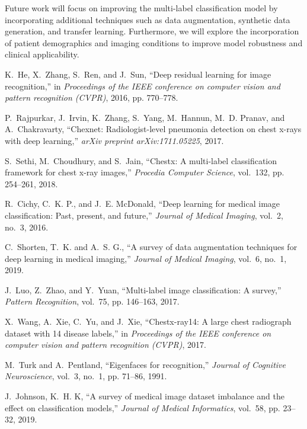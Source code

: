 \documentclass[conference]{IEEEtran}
\begin{document}
Future work will focus on improving the multi-label classification model by incorporating additional techniques such as data augmentation, synthetic data generation, and transfer learning. Furthermore, we will explore the incorporation of patient demographics and imaging conditions to improve model robustness and clinical applicability.

\begin{thebibliography}{00}

K.~He, X.~Zhang, S.~Ren, and J.~Sun, ``Deep residual learning for image recognition,'' in \emph{Proceedings of the IEEE conference on computer vision and pattern recognition (CVPR)}, 2016, pp. 770--778.

P.~Rajpurkar, J.~Irvin, K.~Zhang, S.~Yang, M.~Hannun, M.~D. Pranav, and A.~Chakravarty, ``Chexnet: Radiologist-level pneumonia detection on chest x-rays with deep learning,'' \emph{arXiv preprint arXiv:1711.05225}, 2017.

S.~Sethi, M.~Choudhury, and S.~Jain, ``Chestx: A multi-label classification framework for chest x-ray images,'' \emph{Procedia Computer Science}, vol.~132, pp. 254--261, 2018.

R.~Cichy, C.~K. P., and J.~E. McDonald, ``Deep learning for medical image classification: Past, present, and future,'' \emph{Journal of Medical Imaging}, vol.~2, no.~3, 2016.

C.~Shorten, T.~K. and A.~S. G., ``A survey of data augmentation techniques for deep learning in medical imaging,'' \emph{Journal of Medical Imaging}, vol.~6, no.~1, 2019.

J.~Luo, Z.~Zhao, and Y.~Yuan, ``Multi-label image classification: A survey,'' \emph{Pattern Recognition}, vol.~75, pp. 146--163, 2017.

X.~Wang, A.~Xie, C.~Yu, and J.~Xie, ``Chestx-ray14: A large chest radiograph dataset with 14 disease labels,'' in \emph{Proceedings of the IEEE conference on computer vision and pattern recognition (CVPR)}, 2017.

M.~Turk and A.~Pentland, ``Eigenfaces for recognition,'' \emph{Journal of Cognitive Neuroscience}, vol.~3, no.~1, pp. 71--86, 1991.

J.~Johnson, K.~H. K, ``A survey of medical image dataset imbalance and the effect on classification models,'' \emph{Journal of Medical Informatics}, vol.~58, pp. 23--32, 2019.

\end{thebibliography}
\end{document}

